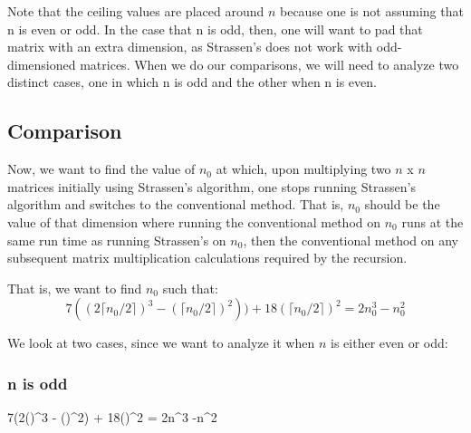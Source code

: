 \documentclass[]{article}
\begin{document}
Note that the ceiling values are placed around $n$ because one is not assuming that n is even or odd.  In the case that n is odd, then, one will want to pad that matrix with an extra dimension, as Strassen's does not work with odd-dimensioned matrices.  When we do our comparisons, we will need to analyze two distinct cases, one in which n is odd and the other when n is even. 

\subsection{Comparison}
Now, we want to find the value of $n_0$ at which, upon multiplying two $n$ x $n$ matrices initially using Strassen's algorithm, one stops running Strassen's algorithm and switches to the conventional method.  That is, $n_0$ should be the value of that dimension where running the conventional method on $n_0$ runs at the same run time as running Strassen's on $n_0$, then the conventional method on any subsequent matrix multiplication calculations required by the recursion.  

That is, we want to find $n_0$ such that: $$7((2\lceil n_0/2 \rceil)^3 -( \lceil n_0/2 \rceil)^2)) + 18(\lceil n_0/2 \rceil )^ 2 = 2n_0^3 - n_0^2  $$

We look at two cases, since we want to analyze it when $n$ is either even or odd:

\subsubsection{n is odd}
$$7(2()^3 - ()^2) + 18()^2 = 2n^3 -n^2
\end{document}
